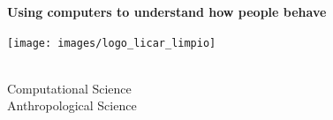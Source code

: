 \documentclass[a0]{a0poster}
\begin{document}
\centering

\fontsize{150}{0}\textbf{Using computers to understand how people behave}\\[1cm] %
\vspace{0.5cm}
\begin{multicols}{2}
\columnseprule=0pt
\columnsep=10pt


\vspace*{0.55cm} \hspace*{37cm}\texttt{[image: images/logo\_licar\_limpio]}
 
 \columnbreak
\vspace*{-0.25cm}
\\[1cm]
{\fontsize{55}{55}\selectfont 
\hspace{-46cm} Computational Science \\[0.3cm]
\hspace{-46cm} Anthropological Science}

 
 
\end{multicols}



\vspace{4cm}
\end{document}
